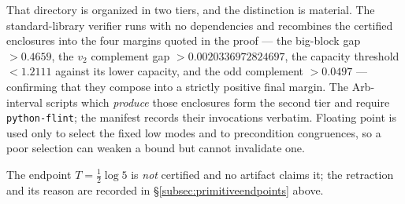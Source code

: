 \documentclass[11pt]{amsart}
\theoremstyle{definition}
\theoremstyle{remark}
\begin{document}
That directory is organized in two tiers, and the distinction is material.
The standard-library verifier
 runs with no dependencies
and recombines the certified enclosures into the four margins quoted in the
proof --- the big-block gap \(>0.4659\), the \(v_2\) complement gap
\(>0.0020336972824697\), the capacity threshold \(<1.2111\) against its lower
capacity, and the odd complement \(>0.0497\) --- confirming that they compose
into a strictly positive final margin.  The Arb-interval scripts which
\emph{produce} those enclosures form the second tier and require
\texttt{python-flint}; the manifest records their invocations verbatim.
Floating point is used only to select the fixed low modes and to precondition
congruences, so a poor selection can weaken a bound but cannot invalidate one.

The endpoint \(T=\frac12\log5\) is \emph{not} certified and no artifact claims
it; the retraction and its reason are recorded in
\S\ref{subsec:primitiveendpoints} above.
\end{document}
